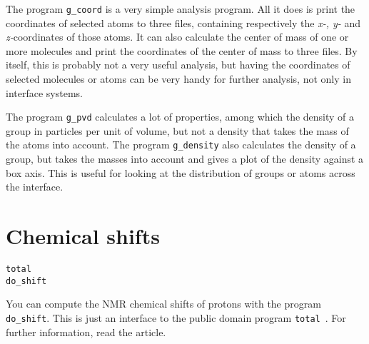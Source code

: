 The program {\tt g\_coord} is a very simple analysis program. All it
does is print the coordinates of selected atoms to three files,
containing respectively the {\em x-, y-} and {\em z-}coordinates of
those atoms. It can also calculate the center of mass of one or more
molecules and print the coordinates of the center of mass to three
files. By itself, this is probably not a very useful analysis, but
having the coordinates of selected molecules or atoms can be very
handy for further analysis, not only in interface systems.

The program {\tt g\_pvd} calculates a lot of properties, among which
the density of a group in particles per unit of volume, but not a
density that takes the mass of the atoms into account. The program
{\tt g\_density} also calculates the density of a group, but takes the
masses into account and gives a plot of the density against a box
axis. This is useful for looking at the distribution of groups or
atoms across the interface.


\section{Chemical shifts}
\begin{verbatim}
total
do_shift
\end{verbatim}
You can compute the NMR chemical shifts of protons with the program
{\tt do\_shift}. This is just an {\gromacs} interface to the public
domain program {\tt total}~\cite{Williamson93a}. For further
information, read the article.

